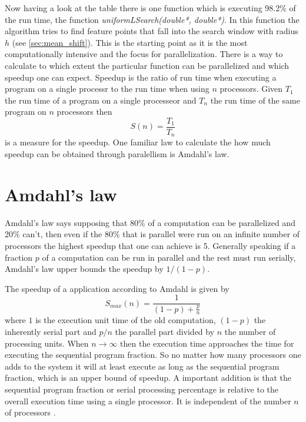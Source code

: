 Now having a look at the table there is one function which is
executing 98.2\% of the run time, the function
\emph{uniformLSearch(double*, double*)}. In this function the
algorithm tries to find feature points that fall into the search
window with radius $h$ (see \autoref{sec:mean_shift}). This is the
starting point as it is the most computationally intensive and the
focus for parallelization. There is a way to calculate to which extent
the particular function can be parallelized and which speedup one can
expect. Speedup is the ratio of run time when executing a program on a
single processr to the run time when using $n$ processors. Given $T_1$
the run time of a program on a single processeor and $T_n$ the run
time of the same program on $n$ processors then
\begin{equation}\label{eq:speedup}
  S(n) = \frac{T_1}{T_n}
\end{equation}
is a measure for the speedup. One familiar law to calculate the how
much speedup can be obtained through paralellism is Amdahl's law.

\section{Amdahl's law}
\label{sec:amdahl_s_law}
Amdahl's law says supposing that 80\% of a computation can be
parallelized and 20\% can't, then even if the 80\% that is parallel
were run on an infinite number of processors the highest speedup that
one can achieve is 5. Generally speaking if a fraction $p$ of a
computation can be run in parallel and the rest must run serially,
Amdahl's law upper bounds the speedup by $1/(1-p)$.

The speedup of a application according to Amdahl is given by
\begin{equation}\label{eq:amdahl}
  S_{max}(n) = \frac{1}{(1-p) + \frac{p}{n}}
\end{equation} 
where $1$ is the execution unit time of the old computation, $(1-p)$
the inherently serial part and $p/n$ the parallel part divided by $n$
the number of processing units. When $n \rightarrow \infty$ then the
execution time approaches the time for executing the sequential
program fraction. So no matter how many processors one adds to the
system it will at least execute as long as the sequential program
fraction, which is an upper bound of speedup. A important addition is
that the sequential program fraction or serial processing percentage
is relative to the overall execution time using a single processor. It
is independent of the number $n$ of processors
\citeauthor{citeulike:3838998} \citep{citeulike:3838998}.

